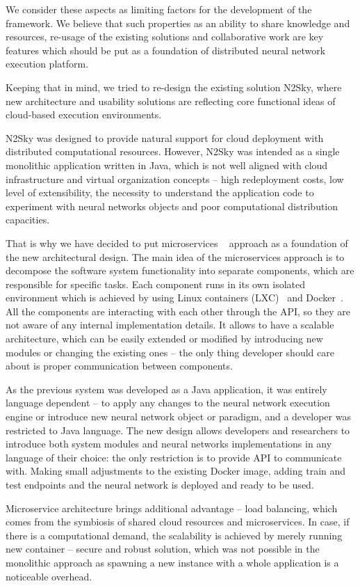 \documentclass[conference]{IEEEtran}
\begin{document}
We consider these aspects as limiting factors for the development of the framework. We believe that such properties as an ability to share knowledge and resources, re-usage of the existing solutions and collaborative work are key features which should be put as a foundation of distributed neural network execution platform.

Keeping that in mind, we tried to re-design the existing solution N2Sky, where new architecture and usability solutions are reflecting core functional ideas of cloud-based execution environments.

N2Sky was designed to provide natural support for cloud deployment with distributed computational resources. However, N2Sky was intended as a single monolithic application written in Java, which is not well aligned with cloud infrastructure and virtual organization concepts -- high redeployment costs, low level of extensibility, the necessity to understand the application code to experiment with neural networks objects and poor computational distribution capacities.

That is why we have decided to put microservices ~\cite{micro} approach as a foundation of the new architectural design. The main idea of the microservices approach is to decompose the software system functionality into separate components, which are responsible for specific tasks. Each component runs in its own isolated environment which is achieved by using Linux containers (LXC)~\cite{LXC} and Docker~\cite{docker}. All the components are interacting with each other through the API, so they are not aware of any internal implementation details. It allows to have a scalable architecture, which can be easily extended or modified by introducing new modules or changing the existing ones -- the only thing developer should care about is proper communication between components.

As the previous system was developed as a Java application, it was entirely language dependent -- to apply any changes to the neural network execution engine or introduce new neural network object or paradigm, and a developer was restricted to Java language. The new design allows developers and researchers to introduce both system modules and neural networks implementations in any language of their choice: the only restriction is to provide API to communicate with. Making small adjustments to the existing Docker image, adding train and test endpoints and the neural network is deployed and ready to be used.

Microservice architecture brings additional advantage -- load balancing, which comes from the symbiosis of shared cloud resources and microservices. In case, if there is a computational demand, the scalability is achieved by merely running new container -- secure and robust solution, which was not possible in the monolithic approach as spawning a new instance with a whole application is a noticeable overhead.
\end{document}
